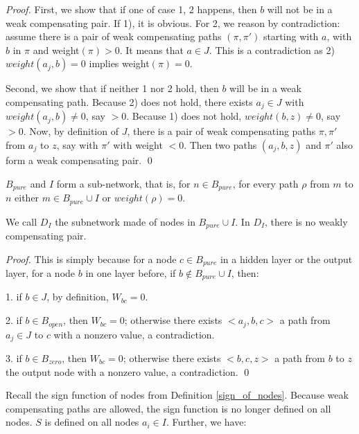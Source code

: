 			\begin{proof}
				First, we show that if one of case 1, 2 happens, then $b$ will not be in a weak compensating pair. If 1), it is obvious. For 2, we reason by contradiction: assume there is a pair of weak compensating paths 	$(\pi,\pi')$ starting with $a$, with $b$ in $\pi$ and weight$(\pi) > 0$. It means that $a \in J$. This is a contradiction as 2) $weight({a_j,b})=0$ implies weight$(\pi)=0$.
				
				Second, we show that if neither 1 nor 2 hold, then $b$ will be in a weak compensating path.
				Because 2) does not hold, there exists $a_j \in J$ with $weight({a_j,b}) \neq 0$, say $>0$.
				Because 1) does not hold, $weight({b,z}) \neq 0$, say $>0$.
				Now, by definition of $J$, there is a pair of weak compensating paths $\pi,\pi'$ 
				from $a_j$ to $z$, say with $\pi'$ with weight $<0$.
				Then two paths $(a_j,b,z)$ and $\pi'$ also form a weak compensating pair. \qed
			\end{proof}
			
			\begin{lemma}\label{lem:subnetwork}
				$B_{pure}$ and $I$ form a sub-network, that is, 
				for $n \in B_{pure}$, for every path $\rho$ from $m$ to $n$
				either $m \in B_{pure}\cup I$ or $weight(\rho)=0$.
			\end{lemma}

			We call $D_I$ the subnetwork  made of nodes in $B_{pure}\cup I$.
			In $D_I$, there is no weakly compensating pair.

			
			\begin{proof}
				This is simply because for a node $c\in B_{pure}$ in a hidden layer or the output layer, for a node $b$ in one layer before, if $b\notin B_{pure}\cup I$, then:
				
				1. if $b\in J$, by definition, $W_{bc}=0$.
				
				2. if $b\in B_{open}$, then $W_{bc}=0$; otherwise there exists $<a_j,b,c>$ a path from $a_j\in J$ to $c$ with a nonzero value, a contradiction.
				
				3. if $b\in B_{zero}$, then $W_{bc}=0$; otherwise there exists $<b,c,z>$ a path from $b$ to $z$ the output node with a nonzero value, a contradiction. \qed
			\end{proof}
			
			
			
			Recall the sign function of nodes from Definition \ref{sign_of_nodes}. Because weak compensating paths are allowed, the sign function is no longer defined on all nodes. $S$ is defined on all nodes $a_i \in I$. 
			Further, we have:
			
